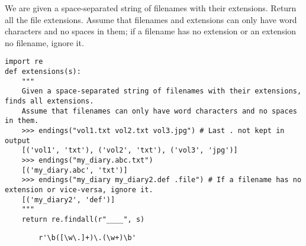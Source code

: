 \begin{blocksection}
\question We are given a space-separated string of filenames with their extensions. Return all the file extensions.
Assume that filenames and extensions can only have word characters and no spaces in them; if a filename has no extension or an extension no filename,
ignore it.

\begin{lstlisting}
import re
def extensions(s):
    """
    Given a space-separated string of filenames with their extensions, finds all extensions.
    Assume that filenames can only have word characters and no spaces in them.
    >>> endings("vol1.txt vol2.txt vol3.jpg") # Last . not kept in output
    [('vol1', 'txt'), ('vol2', 'txt'), ('vol3', 'jpg')]
    >>> endings("my_diary.abc.txt")
    [('my_diary.abc', 'txt')]
    >>> endings("my_diary my_diary2.def .file") # If a filename has no extension or vice-versa, ignore it.
    [('my_diary2', 'def')]
    """
    return re.findall(r"____", s)
\end{lstlisting}

\begin{solution}[2in]
    \begin{lstlisting}
        r'\b([\w\.]+)\.(\w+)\b'
    \end{lstlisting}
\end{solution}
\end{blocksection}